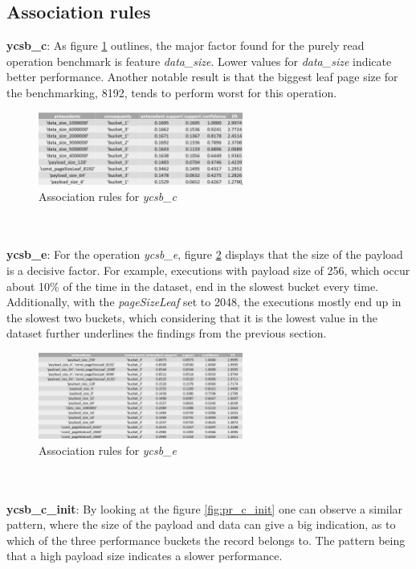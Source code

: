 \subsection{Association rules}

\textbf{ycsb\_c}:
As figure \ref{fig:pr_c} outlines, the major factor found for the purely read operation benchmark is feature \textit{data\_size}. Lower values for  \textit{data\_size} indicate better performance. Another notable result is that the biggest leaf page size for the benchmarking, 8192, tends to perform worst for this operation. 
\begin{figure}[h]
      \centering
      \includegraphics[width=0.6\textwidth]{images/pr_c.png}
      \caption{Association rules for \textit{ycsb\_c}}
      \label{fig:pr_c}
\end{figure}
\\\\
\textbf{ycsb\_e}:
For the operation \textit{ycsb\_e}, figure \ref{fig:pr_e} displays that the size of the payload is a decisive factor. For example, executions with payload size of 256, which occur about 10\% of the time in the dataset, end in the slowest bucket every time. Additionally, with the \textit{pageSizeLeaf} set to 2048, the executions mostly end up in the slowest two buckets, which considering that it is the lowest value in the dataset further underlines the findings from the previous section.
\begin{figure}[h]
      \centering
      \includegraphics[width=0.6\textwidth]{images/pr_e.png}
      \caption{Association rules for \textit{ycsb\_e}}
      \label{fig:pr_e}
\end{figure}
\\\\
\textbf{ycsb\_c\_init}:
By looking at the figure \ref{fig:pr_c_init} one can observe a similar pattern, where the size of the payload and data can give a big indication, as to which of the three performance buckets the record belongs to. The pattern being that a high payload size indicates a slower performance. 

